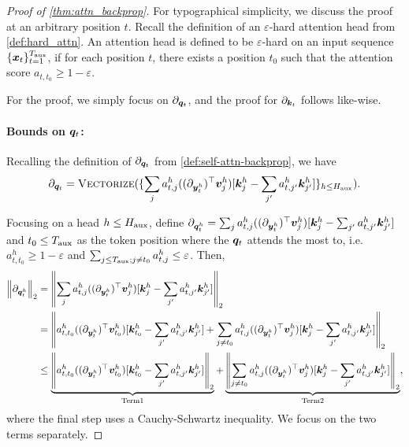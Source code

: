 \boundsofthardattnt*
\begin{proof}[Proof of \cref{thm:attn_backprop}]
    For typographical simplicity, we discuss the proof at an arbitrary position $t$. Recall the definition of an $\varepsilon$-hard attention head from \cref{def:hard_attn}. An attention head is defined to be $\varepsilon$-hard on an input sequence $\{ {\bm{x}}_t \}_{t=1}^{T_{\text{aux}}}$, if for each position $t$, there exists a position $t_0$ such that the attention score $a_{t, t_0} \ge 1 - \varepsilon$.
    
    
    For the proof, we simply focus on $\partial_{{\bm{q}}_t}$, and the proof for $\partial_{{\bm{k}}_t}$ follows like-wise. 
    \paragraph{Bounds on ${\bm{q}}_t$:}
    Recalling the definition of $\partial_{{\bm{q}}_t}$ from \cref{def:self-attn-backprop}, we have
    \begin{align*}
        \partial_{ {\bm{q}}_t } =  \textsc{Vectorize}( \{  \sum_j a^h_{t, j} ( (\partial_{{\bm{y}}_t^h})^{\top} {\bm{v}}^{h}_j ) [ {\bm{k}}^h_j - \sum_{j'} a^h_{t, j'} {\bm{k}}^{h}_{j'} ]  \}_{h \le H_{\text{aux}}} ).
    \end{align*}
    
    Focusing on a head $h \le H_{\text{aux}}$, define $\partial_{ {\bm{q}}_t^h } = \sum_j a^h_{t, j} ( (\partial_{{\bm{y}}_t^h})^{\top} {\bm{v}}^{h}_j ) [ {\bm{k}}^h_j - \sum_{j'} a^h_{t, j'} {\bm{k}}^{h}_{j'} ]$ and $t_0 \le T_{\text{aux}}$ as the token position where the ${\bm{q}}_t$ attends the most to, i.e. $a^h_{t, t_0} \ge 1 - \varepsilon$ and $\sum_{j \le T_{\text{aux}}; j \ne t_0} a^h_{t, j} \le \varepsilon$. Then,
    \begin{align*}
        \left\| \partial_{ {\bm{q}}^h_t } \right\|_2 &= \left\| \sum_j a^h_{t, j} ( (\partial_{{\bm{y}}_t^h})^{\top} {\bm{v}}^{h}_j ) [ {\bm{k}}^h_j - \sum_{j'} a^h_{t, j'} {\bm{k}}^{h}_{j'} ] \right\|_2 \\&
        = \left\| a^h_{t, t_0} ( (\partial_{{\bm{y}}_t^h})^{\top} {\bm{v}}^{h}_{t_0} ) [ {\bm{k}}^h_{t_0} - \sum_{j'} a^h_{t, j'} {\bm{k}}^{h}_{j'} ]  + \sum_{j \ne t_0} a^h_{t, j} ( (\partial_{{\bm{y}}_t^h})^{\top} {\bm{v}}^{h}_j ) [ {\bm{k}}^h_j - \sum_{j'} a^h_{t, j'} {\bm{k}}^{h}_{j'} ] \right\|_2  \\&
        \leq \underbrace{\left\| a^h_{t, t_0} ( (\partial_{{\bm{y}}_t^h})^{\top} {\bm{v}}^{h}_{t_0} ) [ {\bm{k}}^h_{t_0} - \sum_{j'} a^h_{t, j'} {\bm{k}}^{h}_{j'} ] \right\|_2}_{\mathrm{Term 1}} + \underbrace{\left\| \sum_{j \ne t_0} a^h_{t, j} ( (\partial_{{\bm{y}}_t^h})^{\top} {\bm{v}}^{h}_j ) [ {\bm{k}}^h_j - \sum_{j'} a^h_{t, j'} {\bm{k}}^{h}_{j'} ] \right\|_2}_{\mathrm{Term 2}}, 
    \end{align*}
    where the final step uses a Cauchy-Schwartz inequality. We focus on the two terms separately.


\end{proof}
